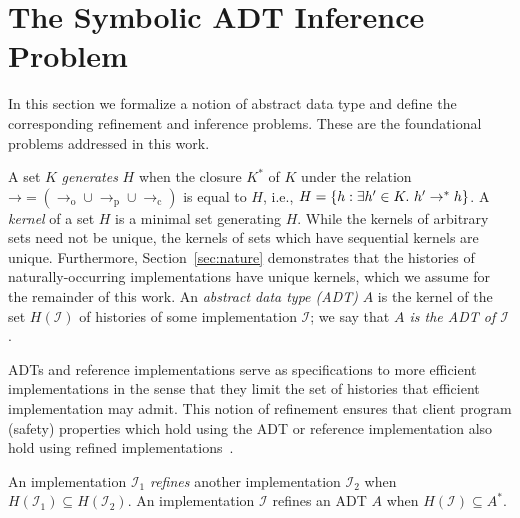 \section{The Symbolic ADT Inference Problem}
\label{sec:inference}

In this section we formalize a notion of abstract data type and define the
corresponding refinement and inference problems. These are the foundational
problems addressed in this work.

A set $K$ \emph{generates} $H$ when the closure $K^*$ of $K$ under the relation
$\mathord\to = (\to_\mathrm{o} \cup \to_\mathrm{p} \cup \to_\mathrm{c})$
is equal to $H$, i.e., $H = {\{{ h : \exists h' \in K.\ h' \to^\ast h }\}}$.
A \emph{kernel} of a set $H$ is a minimal set generating $H$. While the kernels
of arbitrary sets need not be unique, the kernels of sets which
have sequential kernels are unique. Furthermore, Section~\ref{sec:nature}
demonstrates that the histories of naturally-occurring implementations have
unique kernels, which we assume for the remainder of this work.
An \emph{abstract data type (ADT)} $A$ is the kernel of the set $H(\mathcal{I})$
of histories of some implementation $\mathcal{I}$; we say that \emph{$A$ is the
ADT of $\mathcal{I}$}.

ADTs and reference implementations serve as specifications to more efficient
implementations in the sense that they limit the set of histories that efficient
implementation may admit. This notion of refinement ensures that client program
(safety) properties which hold using the ADT or reference implementation also
hold using refined implementations~\cite{conf/popl/BouajjaniEEH15}.

\begin{definition}

  An implementation $\mathcal{I}_1$ \emph{refines} another implementation
  $\mathcal{I}_2$ when $H(\mathcal{I}_1) \subseteq H(\mathcal{I}_2)$. An
  implementation $\mathcal{I}$ refines an ADT $A$ when $H(\mathcal{I})
  \subseteq A^*$.

\end{definition}

